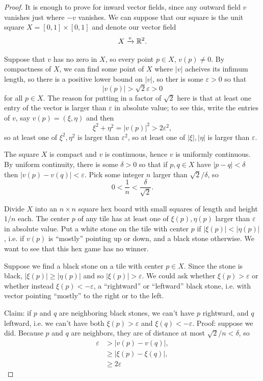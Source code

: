 \begin{proof}
It is enough to prove for inward vector fields, since any outward field \(v\) vanishes just where \(-v\) vanishes.
We can suppose that our square is the unit square \(X=[0,1]\times[0,1]\) and denote our vector field
\[
X\xrightarrow{v}\mathbb{R}^{2}.
\]

Suppose that \(v\) has no zero in \(X\), so every point \(p\in X\), \(v(p)\ne 0\).
By compactness of \(X\), we can find some point of \(X\) where \(|v|\) acheives its infimum length, so there is a positive lower bound on \(|v|\), so ther is some \(\varepsilon>0\) so that
\[
|v(p)|>\sqrt{2}\varepsilon>0
\]
for all \(p\in X\).
The reason for putting in a factor of \(\sqrt{2}\) here is that at least one entry of the vector is larger than \(\varepsilon\) in absolute value; to see this, write the entries of \(v\), say \(v(p)=(\xi,\eta)\) and then
\[
\xi^2+\eta^2=|v(p)|^2>2\varepsilon^2,
\]
so at least one of \(\xi^2,\eta^2\) is larger than \(\varepsilon^2\), so at least one of \(|\xi|,|\eta|\) is larger than \(\varepsilon\).

The square \(X\) is compact and \(v\) is continuous, hence \(v\) is uniformly continuous.
By uniform continuity, there is some \(\delta>0\) so that if \(p,q\in X\) have \(|p-q|<\delta\)  then \(|v(p)-v(q)|<\varepsilon\).
Pick some integer \(n\) larger than \(\sqrt{2}/\delta\), so
\[
0<\frac{1}{n}<\frac{\delta}{\sqrt{2}}.
\]

Divide \(X\) into an \(n\times n\) square hex board with small squares of length and height \(1/n\) each.
The center \(p\) of any tile has at least one of \(\xi(p),\eta(p)\) larger than \(\varepsilon\) in absolute value.
Put a white stone on the tile with center \(p\) if \(|\xi(p)|<|\eta(p)|\), i.e. if \(v(p)\) is ``mostly'' pointing up or down, and a black stone otherwise.
We want to see that this hex game has no winner.

Suppose we find a black stone on a tile with center \(p\in X\).
Since the stone is black, \(|\xi(p)|\ge|\eta(p)|\) and so \(|\xi(p)|>\varepsilon\).
We could ask whether \(\xi(p)>\varepsilon\) or whether instead \(\xi(p)<-\varepsilon\), a ``rightward'' or ``leftward'' black stone, i.e. with vector pointing ``mostly'' to the right or to the left.

Claim: if \(p\) and \(q\) are neighboring black stones, we can't have \(p\) rightward, and \(q\) leftward, i.e. we can't have both \(\xi(p)>\varepsilon\) and \(\xi(q)<-\varepsilon\).
Proof: suppose we did.
Because \(p\) and \(q\) are neighbors, they are of distance at most \(\sqrt{2}/n<\delta\), so
\begin{align*}
\varepsilon&>
|v(p)-v(q)|,\\
&\ge
|\xi(p)-\xi(q)|,
\\
&\ge 2\varepsilon
\end{align*}


\end{proof}
